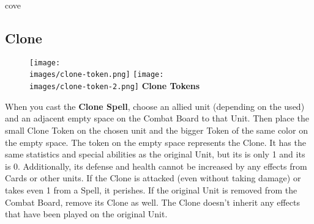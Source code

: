 \begin{multicols}{2}
\begin{expansion}{cove}
    \subsection*{Clone}
    \setlength\intextsep{0pt}
    \setlength\columnsep{1em}
    \begin{wrapfigure}{r}{0.4\linewidth}
        \texttt{[image: \\images/clone-token.png]}\vspace*{1em}
        \texttt{[image: \\images/clone-token-2.png]}
        \centering\textbf{\scriptsize\color{darkcandyapplered}Clone \mbox{Tokens}\\}
    \end{wrapfigure}
    When you cast the \textbf{Clone Spell}, choose an allied unit (depending on the  used) and an adjacent empty space on the Combat Board to that Unit.
    Then place the small Clone Token on the chosen unit and the bigger Token of the same color on the empty space.
    The token on the empty space represents the Clone.
    It has the same statistics and special abilities as the original Unit, but its  is only 1 and its  is 0.
    Additionally, its defense and health cannot be increased by any effects from Cards or other units. %
    If the Clone is attacked (even without taking damage) or takes even 1  from a Spell, it perishes. %
    If the original Unit is removed from the Combat Board, remove its Clone as well.
    The Clone doesn't inherit any effects that have been played on the original Unit.
\end{expansion}
\end{multicols}


